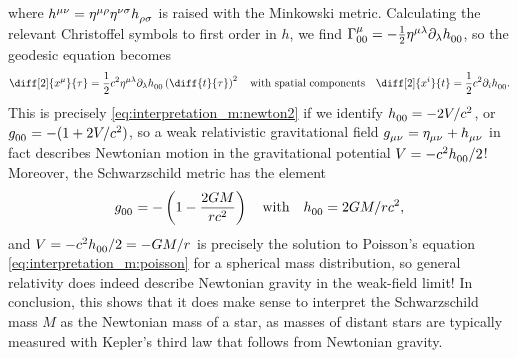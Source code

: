 where $h\indices{^\mu^\nu} = \eta\indices{^\mu^\rho} \eta\indices{^\nu^\sigma} h\indices{_\rho_\sigma}$ is raised with the Minkowski metric.
Calculating the relevant Christoffel symbols to first order in $h$, we find $\Gamma^\mu_{00} = -\frac{1}{2} \eta\indices{^\mu^\lambda} \partial_\lambda h\indices{_0_0}$, so the geodesic equation becomes
\begin{equation*}
	\diff[2]{x^\mu}{\tau} = \frac{1}{2} c^2 \eta\indices{^\mu^\lambda} \partial_\lambda h\indices{_0_0} \left( \diff{t}{\tau} \right)^2
	\quad \text{with spatial components} \quad
	\diff[2]{x^i}{t} = \frac{1}{2} c^2 \partial_i h\indices{_0_0} .
\end{equation*}
This is precisely \cref{eq:interpretation_m:newton2} if we identify $h\indices{_0_0} = -2V/c^2$, or $g\indices{_0_0} = -(1+2V/c^2)$, so a weak relativistic gravitational field $g\indices{_\mu_\nu} = \eta\indices{_\mu_\nu} + h\indices{_\mu_\nu}$ in fact describes Newtonian motion in the gravitational potential $V = -c^2 h\indices{_0_0} / 2$!
Moreover, the Schwarzschild metric has the element
\begin{equation}
	g\indices{_0_0} = - \left( 1 - \frac{2 G M}{r c^2} \right)
	\quad \text{with} \quad
	h\indices{_0_0} = 2GM/rc^2 ,
	\label{eq:weak_field_limit:schwarzschild_metric_tt}
\end{equation}
and $V = -c^2 h\indices{_0_0} / 2 = -G M / r$ is precisely the solution to Poisson's equation \eqref{eq:interpretation_m:poisson} for a spherical mass distribution, so general relativity does indeed describe Newtonian gravity in the weak-field limit!
In conclusion, this shows that it does make sense to interpret the Schwarzschild mass $M$ as the Newtonian mass of a star, as masses of distant stars are typically measured with Kepler's third law that follows from Newtonian gravity. \cite[box 23.1]{ref:mtw}


